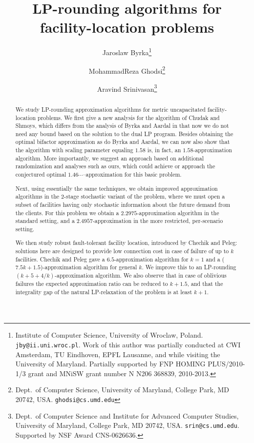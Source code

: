 \documentclass[11pt]{article}
\title{LP-rounding algorithms for facility-location problems}
\author{
Jaroslaw Byrka\thanks{Institute of Computer Science, University of Wroclaw, Poland. {\tt jby@ii.uni.wroc.pl}.
Work of this author was partially conducted at CWI Amsterdam, TU Eindhoven, EPFL Lausanne, and while visiting
the University of Maryland. Partially supported by FNP HOMING PLUS/2010-1/3 grant and MNiSW grant number N N206 368839,
2010-2013.
}
\and
MohammadReza Ghodsi\thanks{Dept.\ of Computer Science, University of Maryland,
College Park, MD 20742, USA. \tt{ghodsi@cs.umd.edu}}
\and
 Aravind Srinivasan\thanks{Dept.\ of Computer Science and
Institute for Advanced Computer Studies, University of Maryland,
College Park, MD 20742, USA. {\tt srin@cs.umd.edu}.
Supported by NSF Award CNS-0626636.}}
\begin{document}
\maketitle

\begin{abstract}
We study LP-rounding approximation algorithms for 
metric uncapacitated facility-location problems.
We first give a new analysis for the algorithm of Chudak and Shmoys, which
 differs from the analysis of Byrka and Aardal in that
now we do not need any bound based on the solution to the dual LP program.
Besides obtaining the optimal bifactor approximation as do
Byrka and Aardal, we can now also show that the algorithm with scaling 
parameter equaling $1.58$ is, in fact, an $1.58$-approximation algorithm.
More importantly, we suggest an approach based on additional randomization
and analyses such as ours, which could achieve or approach the conjectured
optimal $1.46\cdots$--approximation for this basic problem. 

Next, using essentially the same techniques,
we obtain improved approximation algorithms in the $2$-stage stochastic 
variant of the problem, where we
must open a subset of facilities having only stochastic
information about the future demand from the clients.
For this problem
we obtain a $2.2975$-approximation algorithm in the standard setting,
and a $2.4957$-approximation in the more restricted, per-scenario setting.


We then study robust fault-tolerant facility location, 
introduced by Chechik and Peleg: solutions here are designed to provide low connection cost in 
case of failure of up to $k$ facilities.
Chechik and Peleg gave a
$6.5$-approximation algorithm for $k=1$ and a ($7.5k + 1.5$)-approximation algorithm
for general $k$.
We improve this to an LP-rounding $(k+5+4/k)$-approximation algorithm.
We also observe that in case of oblivious failures the expected approximation ratio
can be reduced to $k + 1.5$, and that the integrality gap of the natural
LP-relaxation of the problem is at least $k + 1$. 

\end{abstract}

\setcounter{page}{0}
\thispagestyle{empty}

\newpage
\end{document}

